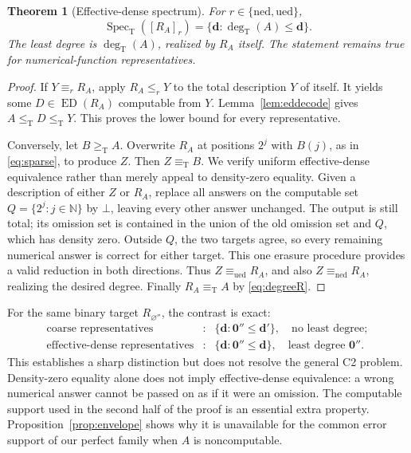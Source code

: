 \documentclass[11pt,a4paper]{article}
\newcommand{\N}{\mathbb N}
\newcommand{\leT}{\leq_{\mathrm T}}
\newcommand{\geT}{\geq_{\mathrm T}}
\newcommand{\eqT}{\equiv_{\mathrm T}}
\newcommand{\degT}{\operatorname{deg}_{\mathrm T}}
\newcommand{\Spec}{\operatorname{Spec}_{\mathrm T}}
\newcommand{\ED}{\operatorname{ED}}
\newcommand{\ned}{\mathrm{ned}}
\newcommand{\ued}{\mathrm{ued}}
\newcommand{\zero}{\mathbf 0}
\newcommand{\ddeg}{\mathbf d}
\newtheorem{theorem}{Theorem}[section]
\theoremstyle{definition}\newtheorem{definition}[theorem]{Definition}
\theoremstyle{remark}\newtheorem{remark}[theorem]{Remark}
\begin{document}
\begin{theorem}[Effective-dense spectrum]\label{thm:edspectrum}
For $r\in\{\ned,\ued\}$,
\[
 \Spec([R_A]_r)=\{\ddeg:\degT(A)\leq\ddeg\}.
\]
The least degree is $\degT(A)$, realized by $R_A$ itself. The statement remains true for numerical-function representatives.
\end{theorem}
\begin{proof}
If $Y\equiv_r R_A$, apply $R_A\leq_rY$ to the total description $Y$ of itself. It yields some $D\in\ED(R_A)$ computable from $Y$. Lemma~\ref{lem:eddecode} gives $A\leT D\leT Y$. This proves the lower bound for every representative.

Conversely, let $B\geT A$. Overwrite $R_A$ at positions $2^j$ with $B(j)$, as in \eqref{eq:sparse}, to produce $Z$. Then $Z\eqT B$. We verify uniform effective-dense equivalence rather than merely appeal to density-zero equality. Given a description of either $Z$ or $R_A$, replace all answers on the computable set $Q=\{2^j:j\in\N\}$ by $\bot$, leaving every other answer unchanged. The output is still total; its omission set is contained in the union of the old omission set and $Q$, which has density zero. Outside $Q$, the two targets agree, so every remaining numerical answer is correct for either target. This one erasure procedure provides a valid reduction in both directions. Thus $Z\equiv_\ued R_A$, and also $Z\equiv_\ned R_A$, realizing the desired degree. Finally $R_A\eqT A$ by \eqref{eq:degreeR}.
\end{proof}

For the same binary target $R_{\varnothing''}$, the contrast is exact:
\[
 \begin{array}{rcl}
 \text{coarse representatives}&:&\{\ddeg:\zero''\leq\ddeg'\},\quad\text{no least degree};\\[2pt]
 \text{effective-dense representatives}&:&\{\ddeg:\zero''\leq\ddeg\},\quad\text{least degree }\zero''.
 \end{array}
\]
This establishes a sharp distinction but does not resolve the general C2 problem. Density-zero equality alone does not imply effective-dense equivalence: a wrong numerical answer cannot be passed on as if it were an omission. The computable support used in the second half of the proof is an essential extra property. Proposition~\ref{prop:envelope} shows why it is unavailable for the common error support of our perfect family when $A$ is noncomputable.
\end{document}
